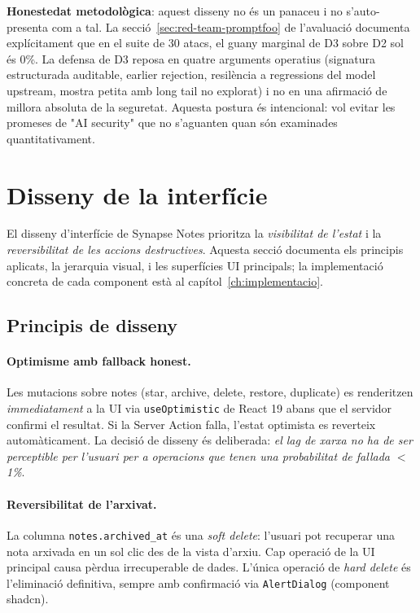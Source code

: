 \textbf{Honestedat metodològica}: aquest disseny no és un panaceu i no s'auto-presenta com a tal. La secció~\ref{sec:red-team-promptfoo} de l'avaluació documenta explícitament que en el suite de 30 atacs, el guany marginal de D3 sobre D2 sol és 0\%. La defensa de D3 reposa en quatre arguments operatius (signatura estructurada auditable, earlier rejection, resilència a regressions del model upstream, mostra petita amb long tail no explorat) i no en una afirmació de millora absoluta de la seguretat. Aquesta postura és intencional: vol evitar les promeses de "AI security" que no s'aguanten quan són examinades quantitativament.

\section{Disseny de la interfície}
\label{sec:disseny-interficie}

El disseny d'interfície de Synapse Notes prioritza la \emph{visibilitat de l'estat} i la \emph{reversibilitat de les accions destructives}. Aquesta secció documenta els principis aplicats, la jerarquia visual, i les superfícies UI principals; la implementació concreta de cada component està al capítol~\ref{ch:implementacio}.

\subsection{Principis de disseny}

\paragraph{Optimisme amb fallback honest.} Les mutacions sobre notes (star, archive, delete, restore, duplicate) es renderitzen \emph{immediatament} a la UI via \texttt{useOptimistic} de React 19 abans que el servidor confirmi el resultat. Si la Server Action falla, l'estat optimista es reverteix automàticament. La decisió de disseny és deliberada: \emph{el lag de xarxa no ha de ser perceptible per l'usuari per a operacions que tenen una probabilitat de fallada $<$1\%}.

\paragraph{Reversibilitat de l'arxivat.} La columna \texttt{notes.archived\_at} és una \emph{soft delete}: l'usuari pot recuperar una nota arxivada en un sol clic des de la vista d'arxiu. Cap operació de la UI principal causa pèrdua irrecuperable de dades. L'única operació de \emph{hard delete} és l'eliminació definitiva, sempre amb confirmació via \texttt{AlertDialog} (component shadcn).

